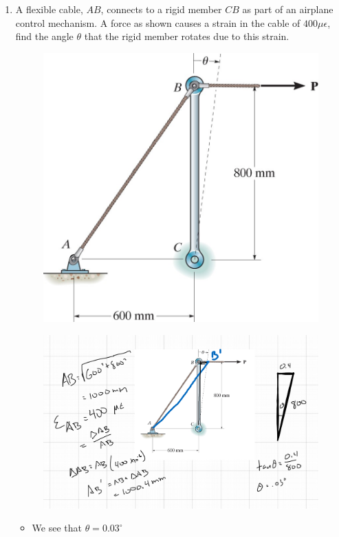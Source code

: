 \documentclass[12pt, oneside]{article}
\begin{document}
\begin{enumerate}
	\item %
		A flexible cable, $AB$, connects to a rigid member $CB$ as part of an airplane control mechanism.
		A force as shown causes a strain in the cable of $400 \mu \epsilon$, find the angle $\theta$ that the rigid member rotates due to this strain.
		\begin{figure}[H]
			\centering
			\includegraphics[width=0.5\linewidth]{tension2}
			\label{fig:tension2}
		\end{figure}
		\begin{figure}[H]
			\centering
			\includegraphics[width=0.6\linewidth]{hw2-2}
		\end{figure}
		\begin{itemize}
			\item We see that $\theta = 0.03^\circ$
		\end{itemize}


\end{enumerate}
\end{document}
